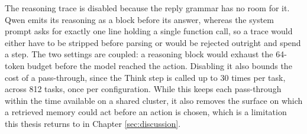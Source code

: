 \begin{itemize}
    The reasoning trace is disabled because the reply grammar has no room for
    it. Qwen emits its reasoning as a block before its answer, whereas the
    system prompt asks for exactly one line holding a single function call, so a
    trace would either have to be stripped before parsing or would be rejected
    outright and spend a step. The two settings are coupled: a reasoning block
    would exhaust the 64-token budget before the model reached the action.
    Disabling it also bounds the cost of a pass-through, since the Think step is
    called up to 30 times per task, across 812 tasks, once per configuration.
    While this keeps each pass-through within the time available on a shared
    cluster, it also removes the surface on which a retrieved memory could act
    before an action is chosen, which is a limitation this thesis returns to in
    Chapter \ref{sec:discussion}.


\end{itemize}
